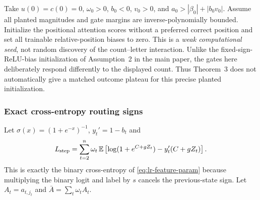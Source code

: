 Take $u(0)=c(0)=0$, $\omega_0>0$, $b_0<0$, $v_0>0$, and
$a_0>|\beta_0|+|b_0v_0|$.  Assume all planted magnitudes and gate margins
are inverse-polynomially bounded.  Initialize the positional attention
scores without a preferred correct position and set all trainable
relative-position biases to zero.  This is a \emph{weak computational seed},
not random discovery of the count--letter interaction.  Unlike the
fixed-sign-ReLU-bias initialization of Assumption~2 in the main paper,
the gates here deliberately respond differently to the displayed count.
Thus Theorem~3 does not automatically give a matched outcome plateau for
this precise planted initialization.

\subsubsection{Exact cross-entropy routing signs}
\label{app:weak-routing-signs}

Let $\sigma(x)=(1+e^{-x})^{-1}$, $y_t'=1-b_t$ and
\begin{equation}\label{eq:lr-logistic-risk}
 L_{\mathrm{step}}=\sum_{t=2}^n\omega_t\,\mathbb E
 \left[\log(1+e^{C+gZ_t})-y_t'(C+gZ_t)\right].
\end{equation}
This is exactly the binary cross-entropy of
\eqref{eq:lr-feature-param} because multiplying the binary logit and
label by $s$ cancels the previous-state sign.
Let $A_t=a_{t,j_t}$ and $\bar A=\sum_t\omega_t A_t$.

